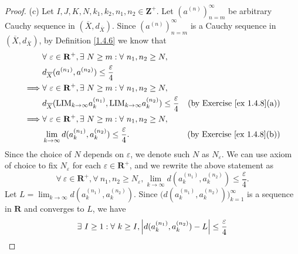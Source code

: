 \begin{proof}{(c)}
    Let \(I, J, K, N, k_1, k_2, n_1, n_2 \in \mathbf{Z}^+\).
    Let \((a^{(n)})_{n = m}^\infty\) be arbitrary Cauchy sequence in \((\overline{X}, d_{\overline{X}})\).
    Since \((a^{(n)})_{n = m}^\infty\) is a Cauchy sequence in \((\overline{X}, d_{\overline{X}})\), by Definition \ref{1.4.6} we know that
    \begin{align*}
                 & \forall\ \varepsilon \in \mathbf{R}^+, \exists\ N \geq m : \forall\ n_1, n_2 \geq N,                                                                               \\
                 & d_{\overline{X}}(a^{(n_1)}, a^{(n_2)}) \leq \frac{\varepsilon}{4}                                                                                                  \\
        \implies & \forall\ \varepsilon \in \mathbf{R}^+, \exists\ N \geq m : \forall\ n_1, n_2 \geq N,                                                                               \\
                 & d_{\overline{X}}(\text{LIM}_{k \to \infty} a_k^{(n_1)}, \text{LIM}_{k \to \infty} a_k^{(n_2)}) \leq \frac{\varepsilon}{4} & \text{(by Exercise \ref{ex 1.4.8}(a))} \\
        \implies & \forall\ \varepsilon \in \mathbf{R}^+, \exists\ N \geq m : \forall\ n_1, n_2 \geq N,                                                                               \\
                 & \lim_{k \to \infty} d(a_k^{(n_1)}, a_k^{(n_2)}) \leq \frac{\varepsilon}{4}.                                               & \text{(by Exercise \ref{ex 1.4.8}(b))}
    \end{align*}
    Since the choice of \(N\) depends on \(\varepsilon\), we denote such \(N\) as \(N_\varepsilon\).
    We can use axiom of choice to fix \(N_\varepsilon\) for each \(\varepsilon \in \mathbf{R}^+\), and we rewrite the above statement as
    \[
        \forall\ \varepsilon \in \mathbf{R}^+, \forall\ n_1, n_2 \geq N_\varepsilon, \lim_{k \to \infty} d(a_k^{(n_1)}, a_k^{(n_2)}) \leq \frac{\varepsilon}{4}.
    \]
    Let \(L = \lim_{k \to \infty} d(a_k^{(n_1)}, a_k^{(n_2)})\).
    Since \(\Big(d(a_k^{(n_1)}, a_k^{(n_2)})\Big)_{k = 1}^\infty\) is a sequence in \(\mathbf{R}\) and converges to \(L\), we have
    \begin{align*}
                 & \exists\ I \geq 1 : \forall\ k \geq I, \abs*{d(a_k^{(n_1)}, a_k^{(n_2)}) - L} \leq \frac{\varepsilon}{4}                                                                                           \\

\end{align*}
\end{proof}
